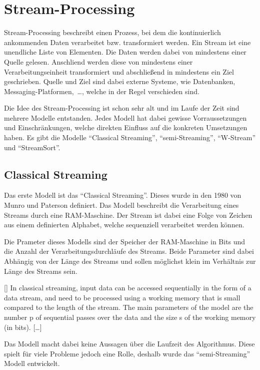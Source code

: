 \section{Stream-Processing}
Stream-Processing beschreibt einen Prozess, bei dem die kontinuierlich
ankommenden Daten verarbeitet bzw. transformiert werden. Ein Stream ist eine
unendliche Liste von Elementen. Die Daten werden dabei von mindestens einer
Quelle gelesen. Anschliend werden diese von mindestens einer Verarbeitungseinheit
transformiert und abschließend in mindestens ein Ziel geschrieben. Quelle und
Ziel sind dabei externe Systeme, wie Datenbanken, Messaging-Platformen,~\dots,
welche in der Regel verschieden sind.

Die Idee des Stream-Processing ist schon sehr alt und im Laufe der Zeit sind
mehrere Modelle entstanden. Jedes Modell hat dabei gewisse Vorraussetzungen
und Einschränkungen, welche direkten Einfluss auf die konkreten Umsetzungen
haben. Es gibt die Modelle \enquote{Classical Streaming}, \enquote{semi-Streaming},
\enquote{W-Stream} und \enquote{StreamSort}.

\subsection{Classical Streaming}
Das erste Modell ist das \enquote{Classical Streaming}. Dieses wurde in den
1980 von Munro und Paterson definiert. Das Modell beschreibt die Verarbeitung
eines Streams durch eine \gls{RAM}-Maschine. Der Stream ist dabei eine Folge von
Zeichen aus einem definierten Alphabet, welche sequenziell verarbeitet werden
können.

Die Prameter dieses Modells sind der Speicher der \gls{RAM}-Maschine in Bits und
die Anzahl der Verarbeitungsdurchläufe des Streams. Beide Parameter sind dabei
Abhängig von der Länge des Streams und sollen möglichst klein im Verhältnis zur
Länge des Streams sein.

[\cite{Ribichini2007}]{
In classical streaming, input data can be accessed sequentially in the form
of a data stream, and need to be processed using a working memory that
is small compared to the length of the stream. The main parameters of the
model are the number p of sequential passes over the data and the size s of the
working memory (in bits). [\dots]
}

Das Modell macht dabei keine Aussagen über die Laufzeit des Algorithmus. Diese
spielt für viele Probleme jedoch eine Rolle, deshalb wurde das
\enquote{semi-Streaming} Modell entwickelt.

